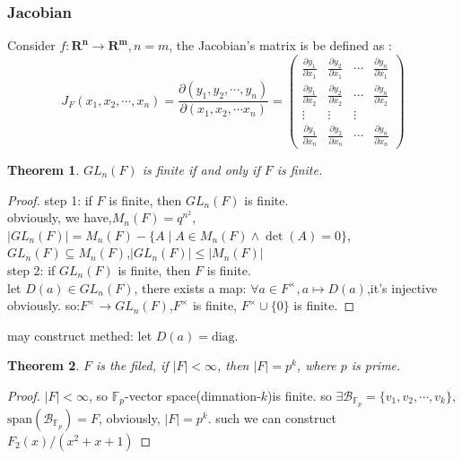 \documentclass[10pt,a4paper]{article}
\newtheorem{theorem}{Theorem}[section]
\begin{document}
\subsubsection{Jacobian}
Consider $f:\mathbf{R^n}\to\mathbf{R^m},n=m$, the Jacobian's matrix is be defined as :
\[J_F(x_1,x_2,\cdots,x_n)=\frac{\partial(y_1,y_2,\cdots,y_n)}{\partial(x_1,x_2,\cdots x_n)}=
\begin{pmatrix}
\frac{\partial y_1}{\partial x_1}&\frac{\partial y_2}{\partial x_1}&\cdots&\frac{\partial y_n}{\partial x_1}\\
\frac{\partial y_1}{\partial x_2}&\frac{\partial y_2}{\partial x_2}&\cdots&\frac{\partial y_n}{\partial x_2}\\
\vdots&\vdots&\vdots\\
\frac{\partial y_1}{\partial x_n}&\frac{\partial y_2}{\partial x_n}&\cdots&\frac{\partial y_n}{\partial x_n}
\end{pmatrix}\]
\begin{theorem}
   $GL_n(F)$ is finite if and only if $F$ is finite.
\end{theorem}
\begin{proof}
   step 1: if $F$ is finite, then $GL_n(F)$ is finite.\\ 
   obviously, we have,$M_n(F)=q^{n^2}$,$|GL_n(F)|=M_n(F)-\{A\mid A\in M_n(F)\land\det(A)=0\}$, $GL_n(F)\subseteq M_n(F)$,$|GL_n(F)|\le|M_n(F)|$\\
    step 2: if $GL_n(F)$ is finite, then $F$ is finite.\\
    let $D(a)\in GL_n(F)$, there exists a map:
    $\forall a\in F^{\times},a\mapsto D(a)$,it's injective obviously.
    so:$F^{\times}\to GL_n(F)$,$F^{\times}$ is finite, $F^{\times}\cup\{0\}$ is finite. 
\end{proof}
may construct methed: let $D(a)=\mathrm{diag}$.
\begin{theorem}
   $F$ is the filed, if $|F|<\infty$, then $|F|=p^k$, where $p$ is prime.
\end{theorem}
\begin{proof}
    $|F|<\infty$, so $\mathbb{F}_p$-vector space(dimnation-$k$)is finite.
    so $\exists\mathcal{B}_{\mathbb{F}_p}=\{v_1,v_2,\cdots,v_k\}$, $\mathrm{span}(\mathcal{B}_{\mathbb{F}_p})=F$, 
    obviously, $|F|=p^k$. such we can construct $F_2(x)/(x^2+x+1)$
\end{proof}
\end{document}

